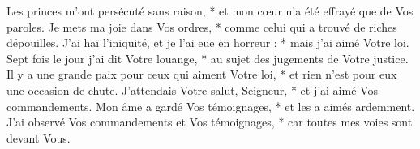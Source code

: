 Les princes m'ont persécuté sans raison, * et mon cœur n'a été effrayé que de Vos paroles.
\versseparator
Je mets ma joie dans Vos ordres, * comme celui qui a trouvé de riches dépouilles.
\versseparator
J'ai haï l'iniquité, et je l'ai eue en horreur ; * mais j'ai aimé Votre loi.
\versseparator
Sept fois le jour j'ai dit Votre louange, * au sujet des jugements de Votre justice.
\versseparator
Il y a une grande paix pour ceux qui aiment Votre loi, * et rien n'est pour eux une occasion de chute.
\versseparator
J'attendais Votre salut, Seigneur, * et j'ai aimé Vos commandements.
\versseparator
Mon âme a gardé Vos témoignages, * et les a aimés ardemment.
\versseparator
J'ai observé Vos commandements et Vos témoignages, * car toutes mes voies sont devant Vous.